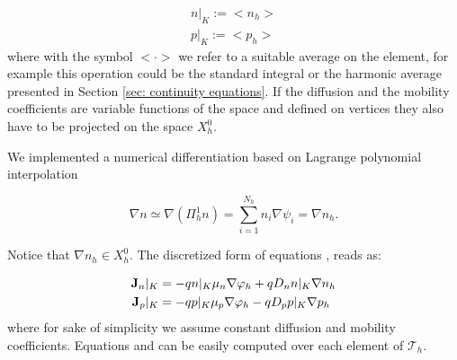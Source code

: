  \begin{align*}
 n|_K := <n_h> \\ 
p|_K := <p_h>
 \end{align*}
where with the symbol $<\cdot >$ we refer to a suitable average on the element, for example this operation could be the standard integral or the harmonic average presented in Section \ref{sec: continuity equations}. If the diffusion and the mobility coefficients are variable functions of the space and defined on vertices they also have to be projected on the space $X_h^0$.

We implemented a numerical differentiation based on Lagrange polynomial interpolation

\begin{equation}
\nabla n \simeq \nabla (\Pi^1_h n) = \sum_{i=1}^{N_h} n_i \nabla \psi_i = \nabla n_h.
\end{equation}
 
Notice that $\nabla n_h \in X_h^0$.
The discretized form of equations ,  reads as:

\begin{align}
\mathbf{J}_n|_K &= -qn|_K\mu_n\nabla \varphi_h + qD_n n|_K\nabla n_h \label{eq: Jn DD discrete}\\ 
\mathbf{J}_p|_K &= -qp|_K\mu_p\nabla \varphi_h - qD_p p|_K \nabla p_h \label{eq: Jp DD discrete} 
\end{align}
where for sake of simplicity we assume constant diffusion and mobility coefficients.
Equations  and  can be easily computed over each element of $\mathcal{T}_h$.

%
%
%
%
 

